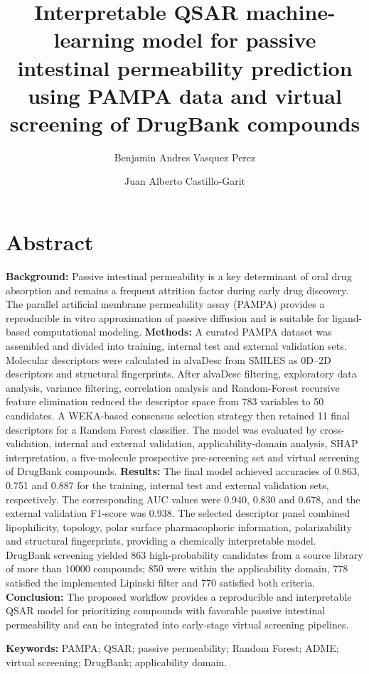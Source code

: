 \documentclass[11pt]{article}
\title{Interpretable QSAR machine-learning model for passive intestinal permeability prediction using PAMPA data and virtual screening of DrugBank compounds}
\author[1]{Benjamin Andres Vasquez Perez}
\author[1]{Juan Alberto Castillo-Garit}
\affil[1]{Facultad de Ciencias Naturales, Matematicas y del Medio Ambiente, Universidad Tecnologica Metropolitana, Santiago, Chile}
\date{}
\begin{document}
\maketitle

\section*{Abstract}
\textbf{Background:} Passive intestinal permeability is a key determinant of oral drug absorption and remains a frequent attrition factor during early drug discovery. The parallel artificial membrane permeability assay (PAMPA) provides a reproducible in vitro approximation of passive diffusion and is suitable for ligand-based computational modeling. \textbf{Methods:} A curated PAMPA dataset was assembled and divided into training, internal test and external validation sets. Molecular descriptors were calculated in alvaDesc from SMILES as 0D--2D descriptors and structural fingerprints. After alvaDesc filtering, exploratory data analysis, variance filtering, correlation analysis and Random-Forest recursive feature elimination reduced the descriptor space from 783 variables to 50 candidates. A WEKA-based consensus selection strategy then retained 11 final descriptors for a Random Forest classifier. The model was evaluated by cross-validation, internal and external validation, applicability-domain analysis, SHAP interpretation, a five-molecule prospective pre-screening set and virtual screening of DrugBank compounds. \textbf{Results:} The final model achieved accuracies of 0.863, 0.751 and 0.887 for the training, internal test and external validation sets, respectively. The corresponding AUC values were 0.940, 0.830 and 0.678, and the external validation F1-score was 0.938. The selected descriptor panel combined lipophilicity, topology, polar surface pharmacophoric information, polarizability and structural fingerprints, providing a chemically interpretable model. DrugBank screening yielded 863 high-probability candidates from a source library of more than 10000 compounds; 850 were within the applicability domain, 778 satisfied the implemented Lipinski filter and 770 satisfied both criteria. \textbf{Conclusion:} The proposed workflow provides a reproducible and interpretable QSAR model for prioritizing compounds with favorable passive intestinal permeability and can be integrated into early-stage virtual screening pipelines.

\textbf{Keywords:} PAMPA; QSAR; passive permeability; Random Forest; ADME; virtual screening; DrugBank; applicability domain.
\end{document}

